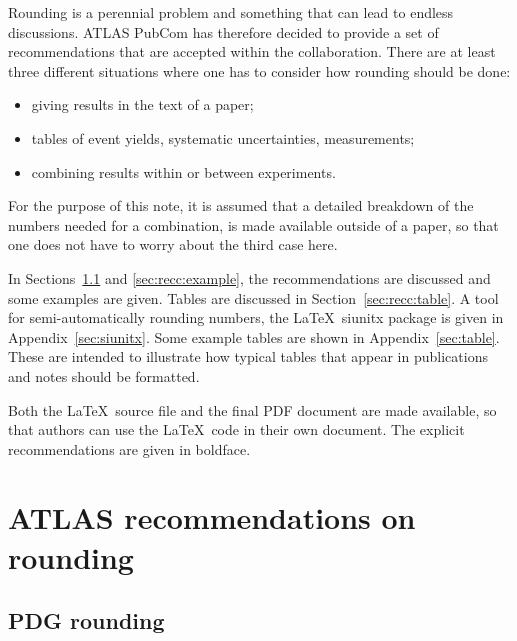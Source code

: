 \documentclass[UKenglish]{style/atlasdoc}
\begin{document}
Rounding is a perennial problem and something that can lead to endless
discussions. ATLAS PubCom has therefore decided to provide
a set of recommendations that are accepted within the
collaboration. There are at least three different situations where one
has to consider how rounding should be done:
\begin{itemize}
\item giving results in the text of a paper;
\item tables of event yields, systematic uncertainties, measurements;
\item combining results within or between experiments.
\end{itemize}
For the purpose of this note, it is assumed that a detailed breakdown of
the numbers needed for a combination, is made available
outside of a paper, so that one does not have to worry about the third
case here.

In Sections~\ref{sec:pdg-rounding} and \ref{sec:recc:example},
the recommendations are discussed and some examples are given. Tables are
discussed in Section~\ref{sec:recc:table}.
A tool for semi-automatically rounding numbers, the
\LaTeX\ \textsf{siunitx} package is given in Appendix~\ref{sec:siunitx}. Some
example tables are shown in Appendix~\ref{sec:table}. These are intended to illustrate how typical
tables that appear in publications and notes should be formatted.

Both the \LaTeX\ source file and the final PDF document are
made available, so that authors can use the \LaTeX\ code in
their own document. The explicit recommendations are given in boldface.


\section{ATLAS recommendations on rounding}
\label{sec:recc}

\subsection{PDG rounding}
\label{sec:pdg-rounding}
\end{document}
